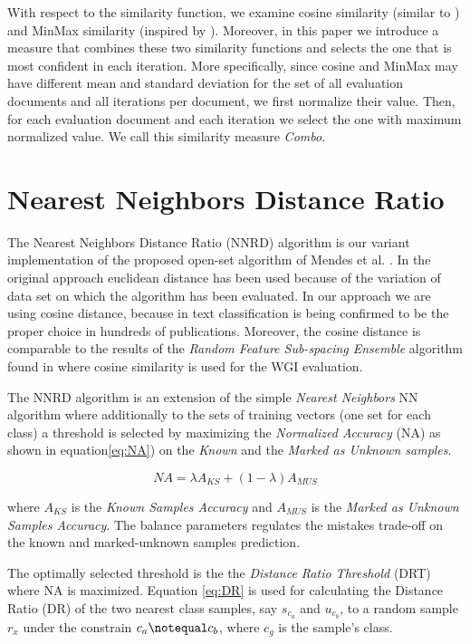 With respect to the similarity function, we examine cosine similarity (similar to \citep{pritsos2013open}) and MinMax similarity (inspired by \citep{koppel2014determining}). Moreover, in this paper we introduce a measure that combines these two similarity functions and selects the one that is most confident in each iteration. More specifically, since cosine and MinMax may have different mean and standard deviation for the set of all evaluation documents and all iterations per document, we first normalize their value. Then, for each evaluation document and each iteration we select the one with maximum normalized value. We call this similarity measure \textit{Combo}.

\section{Nearest Neighbors Distance Ratio}\label{sec:NNRD_Description}

The Nearest Neighbors Distance Ratio (NNRD) algorithm is our variant implementation of the proposed open-set algorithm of Mendes et al. \cite{mendesjunior2016}. In the original approach euclidean distance has been used because of the variation of data set on which the algorithm has been evaluated. In our approach we are using cosine distance, because in text classification is being confirmed to be the proper choice in hundreds of publications. Moreover, the cosine distance is comparable to the results of the \textit{Random Feature Sub-spacing Ensemble} algorithm found in \cite{pritsos2018open} where cosine similarity is used for the WGI evaluation.

The NNRD algorithm is an extension of the simple \textit{Nearest Neighbors} NN algorithm where additionally to the sets of training vectors (one set for each class) a threshold is selected by maximizing the \textit{Normalized Accuracy} (NA) as shown in equation\ref{eq:NA}) on the \textit{Known} and the \textit{Marked as Unknown samples}.

\begin{equation} \label{eq:NA}
    NA = \lambda A_{KS} + (1 - \lambda) A_{MUS}
\end{equation}

\noindent
where $A_{KS}$ is the \textit{Known Samples Accuracy} and $A_{MUS}$ is the \textit{Marked as Unknown Samples Accuracy}. The balance parameters \lambda regulates the mistakes trade-off on the known and marked-unknown samples prediction.

The optimally selected threshold is the the \textit{Distance Ratio Threshold} (DRT) where NA is maximized. Equation \ref{eq:DR} is used for calculating the Distance Ratio (DR) of the two nearest class samples, say $s_{c_{a}}$ and $u_{c_{b}}$, to a random sample $r_{x}$ under the constrain $c_{a} \notequal c_{b}$, where $c_{g}$ is the sample's class.

